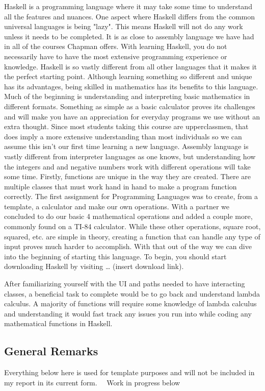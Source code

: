 \documentclass{article}
\begin{document}
Haskell is a programming language where it may take some time to understand all the features and nuances. One aspect where Haskell differs from the common universal languages is being "lazy". This means Haskell will not do any work unless it needs to be completed. It is as close to assembly language we have had in all of the courses Chapman offers. With learning Haskell, you do not necessarily have to have the most extensive programming experience or knowledge. Haskell is so vastly different from all other languages that it makes it the perfect starting point. Although learning something so different and unique has its advantages, being skilled in mathematics has its benefits to this language. Much of the beginning is understanding and interpreting basic mathematics in different formats. Something as simple as a basic calculator proves its challenges and will make you have an appreciation for everyday programs we use without an extra thought. Since most students taking this course are upperclassmen, that does imply a more extensive understanding than most individuals so we can assume this isn’t our first time learning a new language. Assembly language is vastly different from interpreter languages as one knows, but understanding how the integers and and negative numbers work with different operations will take some time. Firstly, functions are unique in the way they are created. There are multiple classes that must work hand in hand to make a program function correctly. The first assignment for Programming Languages was to create, from a template, a calculator and make our own operations. With a partner we concluded to do our basic 4 mathematical operations and added a couple more, commonly found on a TI-84 calculator. While these other operations, square root, squared, etc. are simple in theory, creating a function that can handle any type of input proves much harder to accomplish. With that out of the way we can dive into the beginning of starting this language. To begin, you should start downloading Haskell by visiting … (insert download link). 

\medskip\noindent
After familiarizing yourself with the UI and paths needed to have interacting classes, a beneficial task to complete would be to go back and understand lambda calculus. A majority of functions will require some knowledge of lambda calculus and understanding it would fast track any issues you run into while coding any mathematical functions in Haskell. 


    \subsection{General Remarks}
    Everything below here is used for template purposes and will not be included in my report in its current form. 
    ~~Work in progress below~~
    
\end{document}

